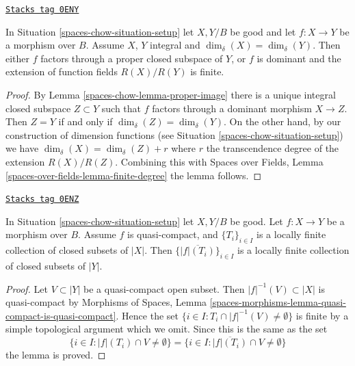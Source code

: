 \begin{lemma}
\label{spaces-chow-lemma-equal-dimension}
\href{https://stacks.math.columbia.edu/tag/0ENY}{\texttt{Stacks tag 0ENY}}

In Situation \ref{spaces-chow-situation-setup} let $X, Y/B$ be good and let
$f : X \to Y$ be a morphism over $B$.
Assume $X$, $Y$ integral and $\dim_\delta(X) = \dim_\delta(Y)$.
Then either $f$ factors through a proper closed subspace
of $Y$, or $f$ is dominant and the extension of function fields
$R(X) / R(Y)$ is finite.
\end{lemma}

\begin{proof}
By Lemma \ref{spaces-chow-lemma-proper-image} there is a unique integral closed
subspace $Z \subset Y$ such that $f$ factors through a dominant
morphism $X \to Z$. Then $Z = Y$ if and only if
$\dim_\delta(Z) = \dim_\delta(Y)$. On the other hand, by
our construction of dimension functions (see Situation \ref{spaces-chow-situation-setup})
we have $\dim_\delta(X) = \dim_\delta(Z) + r$ where $r$ the
transcendence degree of the extension $R(X)/R(Z)$. Combining this with
Spaces over Fields, Lemma \ref{spaces-over-fields-lemma-finite-degree}
the lemma follows.
\end{proof}

\begin{lemma}
\label{spaces-chow-lemma-quasi-compact-locally-finite}
\href{https://stacks.math.columbia.edu/tag/0ENZ}{\texttt{Stacks tag 0ENZ}}

In Situation \ref{spaces-chow-situation-setup} let $X, Y/B$ be good.
Let $f : X \to Y$ be a morphism over $B$.
Assume $f$ is quasi-compact, and $\{T_i\}_{i \in I}$ is a locally
finite collection of closed subsets of $|X|$.
Then $\{\overline{|f|(T_i)}\}_{i \in I}$ is a locally finite
collection of closed subsets of $|Y|$.
\end{lemma}

\begin{proof}
Let $V \subset |Y|$ be a quasi-compact open subset.
Then $|f|^{-1}(V) \subset |X|$ is quasi-compact
by Morphisms of Spaces, Lemma
\ref{spaces-morphisms-lemma-quasi-compact-is-quasi-compact}.
Hence the set
$\{i \in I : T_i \cap |f|^{-1}(V) \not = \emptyset \}$
is finite by a simple topological argument which we omit.
Since this is the same as the set
$$
\{i \in I : |f|(T_i) \cap V \not = \emptyset \} =
\{i \in I : \overline{|f|(T_i)} \cap V \not = \emptyset \}
$$
the lemma is proved.
\end{proof}

